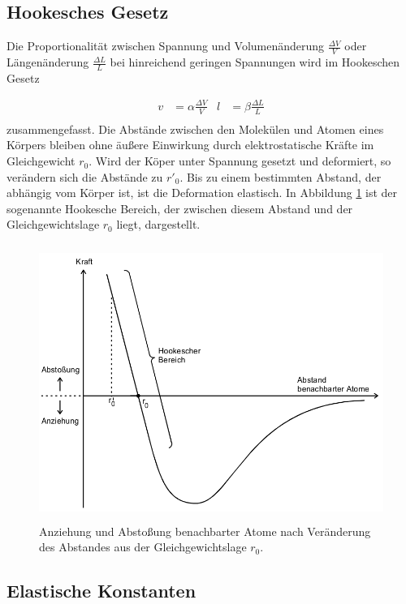 \subsection{Hookesches Gesetz}

Die Proportionalität zwischen Spannung und Volumenänderung
$\frac{\Delta V}{V}$ oder
Längenänderung $\frac{\Delta L}{L}$ bei hinreichend geringen Spannungen
wird im Hookeschen Gesetz

\begin{align}
  v & = \alpha \frac{\Delta V}{V} & l & = \beta \frac{\Delta L}{L} \\
  \label{eqn:Hooke}
\end{align}
zusammengefasst.
Die Abstände zwischen den Molekülen und Atomen eines Körpers bleiben ohne
äußere Einwirkung durch elektrostatische Kräfte im Gleichgewicht $r_0$.
Wird der Köper unter Spannung gesetzt und deformiert, so verändern sich die
Abstände zu $r'_0$.
Bis zu einem bestimmten Abstand, der abhängig vom Körper ist, ist die
Deformation elastisch.
In Abbildung \ref{fig:HookBe} ist der sogenannte Hookesche Bereich, der zwischen
diesem Abstand und der Gleichgewichtslage $r_0$ liegt, dargestellt.

\begin{figure}[h]
  \centering
  \includegraphics[height = 9cm]{HookescherBereich.png}
  \caption{Anziehung und Abstoßung benachbarter Atome nach Veränderung des
  Abstandes aus der Gleichgewichtslage $r_0$.\cite{anleitung}}
  \label{fig:HookBe}
\end{figure}


\subsection{Elastische Konstanten}

